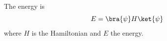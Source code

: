 \documentclass{article}
\begin{document}
The energy is
\begin{equation} E = \bra{\psi} H \ket{\psi} \end{equation}
where $H$ is the Hamiltonian and $E$ the energy.
\end{document}
